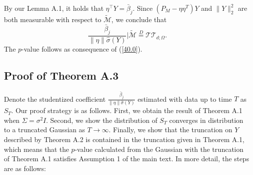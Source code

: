 \documentclass[11pt]{article}
\begin{document}
	By our Lemma A.1, it holds that $\eta^\top Y=\bar{\beta}_j$. Since $(P_M-\eta\eta^T)Y$ and $\|Y\|_2^2$ are both measurable with respect to $\tilde{\mathcal{M}}$, we conclude that
	\begin{equation}\label{40.0}
		\frac{\bar{\beta}_j}{\|\eta\|\hat{\sigma}(Y)}| \tilde{\mathcal{M}}\stackrel{D}{=}\mathcal{TT}_{d;\Omega}.
	\end{equation}
	The $p$-value follows as consequence of (\ref{40.0}).
	
	
	
	\subsection{Proof of Theorem A.3}\label{proof_COL2}
	Denote the studentized coefficient $	\frac{\bar{\beta}_j}{\|\eta\|\hat{\sigma}(Y)}$ estimated with data up to time $T$ as $S_T$. Our proof strategy is as follows. First, we obtain the result of Theorem A.1 when $\Sigma=\sigma^2I$. Second, we show the distribution of $S_T$ converges in distribution to a truncated Gaussian as $T\to\infty$. Finally, we show that the truncation on $Y$ described by Theorem A.2 is contained in the truncation given in Theorem A.1, which means that the $p$-value calculated from the Gaussian with the truncation of Theorem A.1 satisfies Assumption 1 of the main text. %
	In more detail, the steps are as follows:
\end{document}
